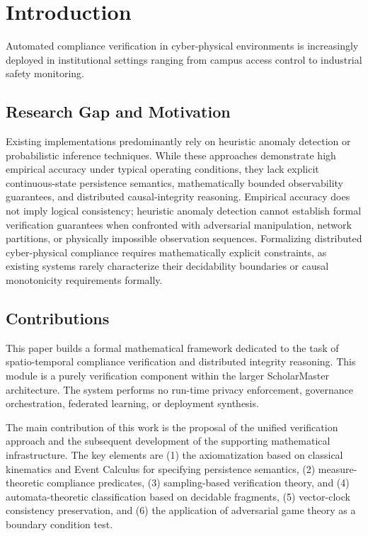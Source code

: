 \documentclass[conference]{IEEEtran}
\begin{document}
\section{Introduction}

Automated compliance verification in cyber-physical environments is increasingly deployed in institutional settings ranging from campus access control to industrial safety monitoring. 

\subsection{Research Gap and Motivation}
Existing implementations predominantly rely on heuristic anomaly detection \cite{b1} or probabilistic inference techniques. While these approaches demonstrate high empirical accuracy under typical operating conditions, they lack explicit continuous-state persistence semantics, mathematically bounded observability guarantees, and distributed causal-integrity reasoning. Empirical accuracy does not imply logical consistency; heuristic anomaly detection cannot establish formal verification guarantees when confronted with adversarial manipulation, network partitions, or physically impossible observation sequences. Formalizing distributed cyber-physical compliance requires mathematically explicit constraints, as existing systems rarely characterize their decidability boundaries or causal monotonicity requirements formally.

\subsection{Contributions}
This paper builds a formal mathematical framework dedicated to the task of spatio-temporal compliance verification and distributed integrity reasoning. This module is a purely verification component within the larger ScholarMaster architecture. The system performs no run-time privacy enforcement, governance orchestration, federated learning, or deployment synthesis. 

The main contribution of this work is the proposal of the unified verification approach and the subsequent development of the supporting mathematical infrastructure. The key elements are (1) the axiomatization based on classical kinematics and Event Calculus for specifying persistence semantics, (2) measure-theoretic compliance predicates, (3) sampling-based verification theory, and (4) automata-theoretic classification based on decidable fragments, (5) vector-clock consistency preservation, and (6) the application of adversarial game theory as a boundary condition test.
\end{document}
